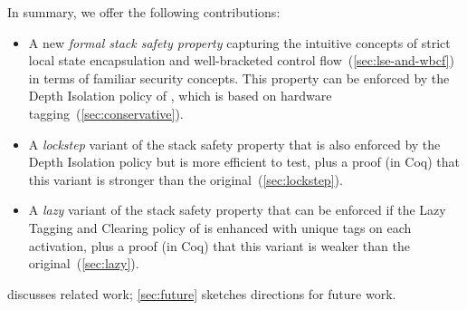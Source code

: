 \documentclass[acmsmall,review,anonymous]{acmart}\settopmatter{printfolios=true,printccs=false,printacmref=false}
\begin{document}
In summary, we offer the following contributions:
\begin{itemize}
\item
  A new {\em formal stack safety property} capturing the
  intuitive concepts of strict local state encapsulation and well-bracketed
  control flow~(\cref{sec:lse-and-wbcf}) in terms of familiar security concepts.
  This property can be enforced by
  the Depth Isolation policy of \citet{DBLP:conf/sp/RoesslerD18}, which is
  based on hardware tagging~(\cref{sec:conservative}).
\item
  A {\em lockstep} variant of the stack safety property that is also
  enforced by the Depth Isolation policy
  but is more efficient to test, plus a proof (in Coq) that this variant is
  stronger than the original~(\cref{sec:lockstep}).
\item
  A {\em lazy} variant of the stack safety property that can be enforced if the
  Lazy Tagging and Clearing policy of \citet{DBLP:conf/sp/RoesslerD18} is enhanced
  with unique tags on each activation, plus a proof (in Coq) that this
  variant is weaker than the original~(\cref{sec:lazy}).
%

\end{itemize}
 discusses related work;
\cref{sec:future} sketches directions for future work.
\end{document}
